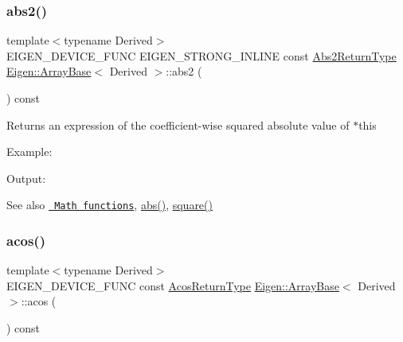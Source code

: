 \subsubsection{\texorpdfstring{abs2()}{abs2()}}
{\footnotesize\ttfamily template$<$typename Derived$>$ \\
E\+I\+G\+E\+N\+\_\+\+D\+E\+V\+I\+C\+E\+\_\+\+F\+U\+NC E\+I\+G\+E\+N\+\_\+\+S\+T\+R\+O\+N\+G\+\_\+\+I\+N\+L\+I\+NE const \mbox{\hyperlink{class_eigen_1_1_cwise_unary_op}{Abs2\+Return\+Type}} \mbox{\hyperlink{class_eigen_1_1_array_base}{Eigen\+::\+Array\+Base}}$<$ Derived $>$\+::abs2 (\begin{DoxyParamCaption}{ }\end{DoxyParamCaption}) const\hspace{0.3cm}{\ttfamily [inline]}}

\begin{DoxyReturn}{Returns}
an expression of the coefficient-\/wise squared absolute value of {\ttfamily $\ast$this} 
\end{DoxyReturn}
Example\+: 
\begin{DoxyCodeInclude}{0}
\end{DoxyCodeInclude}
 Output\+: 
\begin{DoxyVerbInclude}
\end{DoxyVerbInclude}


\begin{DoxySeeAlso}{See also}
\href{group__CoeffwiseMathFunctions.html\#cwisetable_abs2}{\texttt{ Math functions}}, \mbox{\hyperlink{class_eigen_1_1_array_base_a5efe92eb15ea504206269a2a19b9878c}{abs()}}, \mbox{\hyperlink{class_eigen_1_1_array_base_a95c818b933d73944c53bf0226ea106c8}{square()}} 
\end{DoxySeeAlso}
\mbox{\label{class_eigen_1_1_array_base_a823b8a01037260c26ea853f41a75dd87}} 
\subsubsection{\texorpdfstring{acos()}{acos()}}
{\footnotesize\ttfamily template$<$typename Derived$>$ \\
E\+I\+G\+E\+N\+\_\+\+D\+E\+V\+I\+C\+E\+\_\+\+F\+U\+NC const \mbox{\hyperlink{class_eigen_1_1_cwise_unary_op}{Acos\+Return\+Type}} \mbox{\hyperlink{class_eigen_1_1_array_base}{Eigen\+::\+Array\+Base}}$<$ Derived $>$\+::acos (\begin{DoxyParamCaption}{ }\end{DoxyParamCaption}) const\hspace{0.3cm}{\ttfamily [inline]}}

